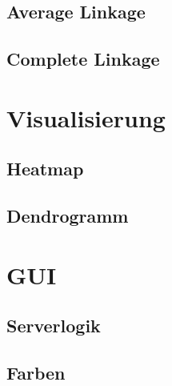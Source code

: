 \documentclass[12pt]{article}
\begin{document}
\subsection{Average Linkage}
\label{average-linkage}

\subsection{Complete Linkage}
\label{complete-linkage}

\newpage
\pagestyle{fancy}
\fancyhead{}
\section{Visualisierung}
\label{visualisierung}

\subsection{Heatmap}
\label{heatmap}

\subsection{Dendrogramm}
\label{dendrogramm}

\newpage
\pagestyle{fancy}
\fancyhead{}
\section{GUI}
\label{gui}

\subsection{Serverlogik}
\label{serverlogik}


\newpage
\pagestyle{fancy}
\fancyhead{}
\subsection{Farben}
\end{document}
